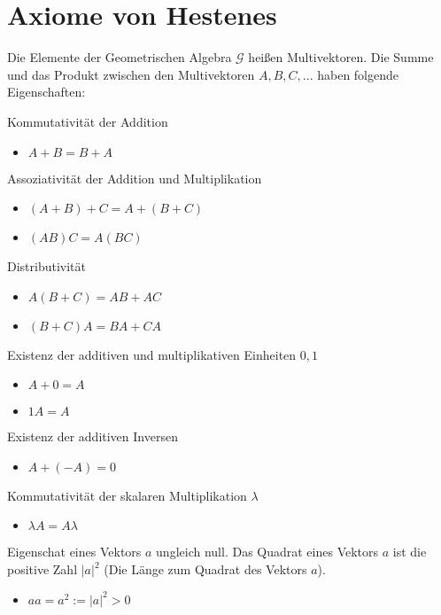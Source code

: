 \documentclass{sajzk}
\begin{document}
\section{Axiome von Hestenes}
\label{ciuz}

Die Elemente der Geometrischen Algebra $\mathscr{G}$ heißen Multivektoren. Die
Summe und das Produkt zwischen den Multivektoren $A, B, C, ...$ haben folgende
Eigenschaften:

Kommutativität der Addition
\begin{itemize}
    \item $A + B = B + A$
\end{itemize}

Assoziativität der Addition und Multiplikation
\begin{itemize}
    \item $(A + B) + C = A + (B + C)$
    \item $(AB)C = A(BC)$
\end{itemize}

Distributivität
\begin{itemize}
    \item $A(B + C) = AB + AC$
    \item $(B + C)A = BA + CA$
\end{itemize}

Existenz der additiven und multiplikativen Einheiten $0, 1$
\begin{itemize}
    \item $A + 0 = A$
    \item $1A = A$
\end{itemize}

Existenz der additiven Inversen
\begin{itemize}
    \item $A + (-A) = 0$
\end{itemize}

Kommutativität der skalaren Multiplikation $\lambda$
\begin{itemize}
    \item $\lambda A = A \lambda$
\end{itemize}

Eigenschat eines Vektors $a$ ungleich null. Das Quadrat eines Vektors $a$ ist
die positive Zahl $|a|^2$ (Die Länge zum Quadrat des Vektors $a$).

\begin{itemize}
    \item $aa = a^2 := |a|^2 > 0$
\end{itemize}
\end{document}
